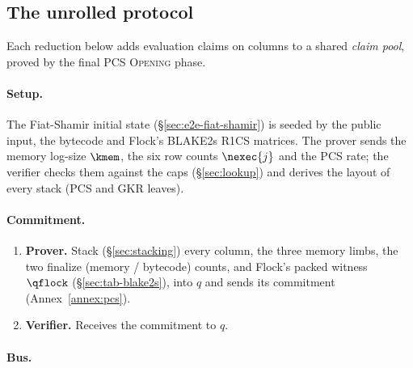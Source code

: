 \subsection{The unrolled protocol}\label{sec:e2e-unrolled}

Each reduction below adds evaluation claims on columns to a shared \emph{claim pool}, proved by the final PCS \textsc{Opening} phase.

\paragraph{Setup.}


The Fiat-Shamir initial state (\S\ref{sec:e2e-fiat-shamir}) is seeded by the public input, the bytecode and Flock's BLAKE2s R1CS matrices. The prover sends the memory log-size $\kmem$, the six row counts $\nexec{j}$ and the PCS rate; the verifier checks them against the caps (\S\ref{sec:lookup}) and derives the layout of every stack (PCS and GKR leaves).

\paragraph{Commitment.}

\begin{enumerate}
\item \textbf{Prover.} Stack (\S\ref{sec:stacking}) every column, the three memory limbs, the two finalize (memory / bytecode) counts, and Flock's packed witness $\qflock$ (\S\ref{sec:tab-blake2s}), into $q$ and sends its commitment (Annex~\ref{annex:pcs}).
\item \textbf{Verifier.} Receives the commitment to $q$.
\end{enumerate}

\paragraph{Bus.}

